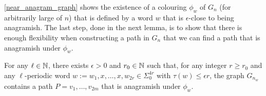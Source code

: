 \documentclass{patmorin}
\begin{document}
\cref{near_anagram_graph} shows the existence of a colouring $\phi_w$ of $G_n$ (for arbitrarily large of $n$) that is defined by a word $w$ that is $\epsilon$-close to being anagramish.  The last step, done in the next lemma, is to show that there is enough flexibility when constructing a path in $G_n$ that we can find a path that is anagramish under $\phi_w$.

\begin{lem}\label{anagramish_path}
    For any $\ell\in\mathbb{N}$, there exists $\epsilon>0$ and $r_0\in\mathbb{N}$ such that, for any integer $r\ge r_0$ and any $\ell$-periodic word $w:=w_1,x,\ldots,x,w_{2r}\in\Sigma_0^{4r}$ with $\tau(w)\le\epsilon r$, the graph $G_{n_w}$ contains a path $P=v_1,\ldots,v_{2m}$ that is anagramish under $\phi_w$.
\end{lem}
\end{document}
